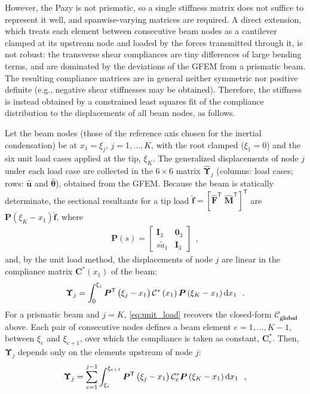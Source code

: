 \documentclass[journal]{new-aiaa}
\newcommand{\vect}[1]{\bm{#1}}
\def\tens#1{\bm{#1}}
\def\til#1{\widetilde{#1}}
\def\lb{\left[}
\def\rb{\right]}
\def\lp{\left(}
\def\rp{\right)}
\def\T{\mathsf{T}}
\def\Ithree{\tens{I}_3}
\def\zthree{\tens{0}_3}
\def\aonetil{\til{a}_1}
\def\u{\vect{u}}
\def\Flex{\mathcal{\tens{C}}^*}
\def\Flexe{\Flex_e}
\begin{document}
However, the Pazy is not prismatic, so a single stiffness matrix does not suffice to represent it well, and spanwise-varying matrices are required. A direct extension, which treats each element between consecutive beam nodes as a cantilever clamped at its upstream node and loaded by the forces transmitted through it, is not robust: the transverse shear compliances are tiny differences of large bending terms, and are dominated by the deviations of the GFEM from a prismatic beam. The resulting compliance matrices are in general neither symmetric nor positive definite (e.g., negative shear stiffnesses may be obtained). Therefore, the stiffness is instead obtained by a constrained least squares fit of the compliance distribution to the displacements of all beam nodes, as follows.

Let the beam nodes (those of the reference axis chosen for the inertial condensation) be at $x_1=\xi_j$, $j=1,\dots,K$, with the root clamped ($\xi_1=0$) and the six unit load cases applied at the tip, $\xi_K$. The generalized displacements of node $j$ under each load case are collected in the $6\times 6$ matrix $\hat{\tens{\Upsilon}}_j$ (columns: load cases; rows: $\hat{\u}$ and $\hat{\vect{\theta}}$), obtained from the GFEM. Because the beam is statically determinate, the sectional resultants for a tip load $\hat{\vect{f}}=\lb\hat{\vect{F}}^\T\;\hat{\vect{M}}^\T\rb^\T$ are $\tens{P}\lp\xi_K-x_1\rp\hat{\vect{f}}$, where
\begin{align}
    \tens{P}\lp s\rp =
    \begin{bmatrix}
        \Ithree & \zthree \\
        s\aonetil & \Ithree
    \end{bmatrix} \ \ ,
\end{align}
and, by the unit load method, the displacements of node $j$ are linear in the compliance matrix $\Flex\lp x_1\rp$ of the beam:
\begin{align}
    \tens{\Upsilon}_j = \int_{0}^{\xi_j} \tens{P}^\T\lp\xi_j-x_1\rp \Flex\lp x_1\rp \tens{P}\lp\xi_K-x_1\rp \dif x_1 \ \ .
    \label{eq:unit_load}
\end{align}
For a prismatic beam and $j=K$, \cref{eq:unit_load} recovers the closed-form $\tens{\mathcal{C}_\text{global}}$ above. Each pair of consecutive nodes defines a beam element $e=1,\dots,K-1$, between $\xi_e$ and $\xi_{e+1}$, over which the compliance is taken as constant, $\Flexe$. Then, $\tens{\Upsilon}_j$ depends only on the elements upstream of node $j$:
\begin{align}
    \tens{\Upsilon}_j = \sum_{e=1}^{j-1} \int_{\xi_e}^{\xi_{e+1}} \tens{P}^\T\lp\xi_j-x_1\rp \Flexe \tens{P}\lp\xi_K-x_1\rp \dif x_1 \ \ ,
    \label{eq:unit_load_elem}
\end{align}
\end{document}
